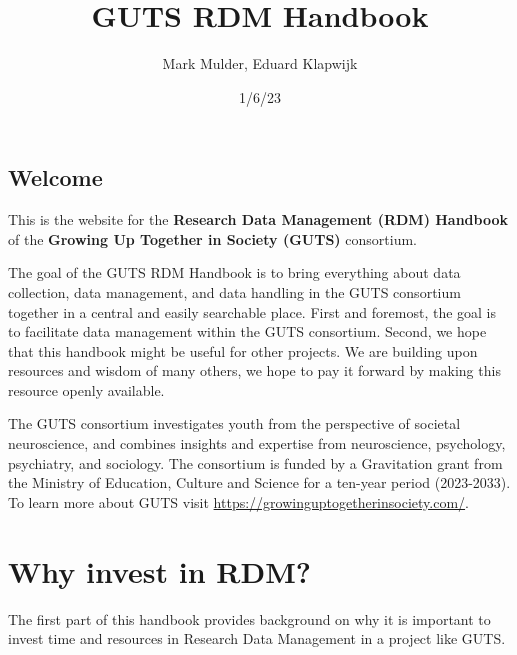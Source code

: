 \documentclass[
  letterpaper,
  DIV=11,
  numbers=noendperiod]{scrreprt}
\title{GUTS RDM Handbook}
\author{Mark Mulder, Eduard Klapwijk}
\date{1/6/23}
\renewcommand*\contentsname{Table of contents}
\newcommand\contentsname{Table of contents}
\begin{document}
\maketitle
\ifdefined\Shaded\renewenvironment{Shaded}{\begin{tcolorbox}[breakable, interior hidden, frame hidden, boxrule=0pt, sharp corners, enhanced, borderline west={3pt}{0pt}{shadecolor}]}{\end{tcolorbox}}\fi

\renewcommand*\contentsname{Table of contents}
{
\hypersetup{linkcolor=}
\setcounter{tocdepth}{2}
\tableofcontents
}

\hypertarget{welcome}{%
\chapter*{Welcome}\label{welcome}}


This is the website for the \textbf{Research Data Management (RDM)
Handbook} of the \textbf{Growing Up Together in Society (GUTS)}
consortium.

The goal of the GUTS RDM Handbook is to bring everything about data
collection, data management, and data handling in the GUTS consortium
together in a central and easily searchable place. First and foremost,
the goal is to facilitate data management within the GUTS consortium.
Second, we hope that this handbook might be useful for other projects.
We are building upon resources and wisdom of many others, we hope to pay
it forward by making this resource openly available.

The GUTS consortium investigates youth from the perspective of societal
neuroscience, and combines insights and expertise from neuroscience,
psychology, psychiatry, and sociology. The consortium is funded by a
Gravitation grant from the Ministry of Education, Culture and Science
for a ten-year period (2023-2033). To learn more about GUTS visit
\url{https://growinguptogetherinsociety.com/}.

\part{Why invest in RDM?}

The first part of this handbook provides background on why it is
important to invest time and resources in Research Data Management in a
project like GUTS.
\end{document}
